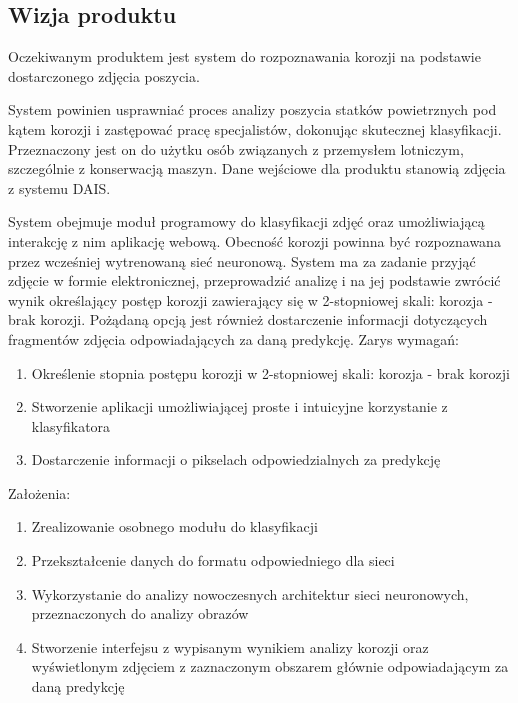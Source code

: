 \documentclass[polish,12pt]{aghthesis}
\begin{document}
\subsection{Wizja produktu}
\par
Oczekiwanym produktem jest system do rozpoznawania korozji na podstawie dostarczonego zdjęcia poszycia.
\par
System powinien usprawniać proces analizy poszycia statków powietrznych pod kątem korozji i zastępować pracę specjalistów, dokonując skutecznej klasyfikacji. Przeznaczony jest on do użytku osób związanych z przemysłem lotniczym, szczególnie z konserwacją maszyn. Dane wejściowe dla produktu stanowią zdjęcia z systemu DAIS.
\par
System obejmuje moduł programowy do klasyfikacji zdjęć oraz umożliwiającą interakcję z nim aplikację webową. Obecność korozji powinna być rozpoznawana przez wcześniej wytrenowaną sieć neuronową. System ma za zadanie przyjąć zdjęcie w formie elektronicznej, przeprowadzić analizę i na jej podstawie zwrócić wynik określający postęp korozji zawierający się w 2-stopniowej skali: korozja - brak korozji. Pożądaną opcją jest również dostarczenie informacji dotyczących fragmentów zdjęcia odpowiadających za daną predykcję.
\vspace{5mm}
\newline Zarys wymagań:
\begin{enumerate}
    \item Określenie stopnia postępu korozji w 2-stopniowej skali: korozja - brak korozji
    \item Stworzenie aplikacji umożliwiającej proste i intuicyjne korzystanie z klasyfikatora
    \item Dostarczenie informacji o pikselach odpowiedzialnych za predykcję
\end{enumerate}
Założenia:
\begin{enumerate}
    \item Zrealizowanie osobnego modułu do klasyfikacji
    \item Przekształcenie danych do formatu odpowiedniego dla sieci
    \item Wykorzystanie do analizy nowoczesnych architektur sieci neuronowych, przeznaczonych do analizy obrazów
    \item Stworzenie interfejsu z wypisanym wynikiem analizy korozji oraz wyświetlonym zdjęciem z zaznaczonym obszarem głównie odpowiadającym za daną predykcję
\end{enumerate}
\end{document}
